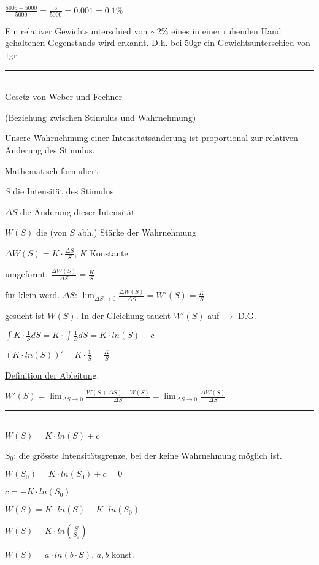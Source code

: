 \documentclass[18pt,a4paper]{scrreprt}
\begin{document}
$\frac{5005-5000}{5000} = \frac{5}{5000} = 0.001 = 0.1\%$

Ein relativer Gewichtsunterschied von $\sim 2\%$ eines in einer ruhenden Hand gehaltenen Gegenstands wird erkannt. D.h. bei $50$gr ein Gewichtsunterschied von $1$gr.

\rule{\textwidth}{0.4mm}\\

\uline{Gesetz von Weber und Fechner}

(Beziehung zwischen Stimulus und Wahrnehmung)

Unsere Wahrnehmung einer Intensitätsänderung ist proportional zur relativen Änderung des Stimulus.

Mathematisch formuliert:

$S$ die Intensität des Stimulus

$\Delta S$ die Änderung dieser Intensität

$W(S)$ die (von $S$ abh.) Stärke der Wahrnehmung

$\Delta W(S) = K \cdot \frac{\Delta S}{S}$, $K$ Konstante

umgeformt: $\frac{\Delta W(S)}{\Delta S} = \frac{K}{S}$

für klein werd. $\Delta S$: $\lim_{\Delta S\to 0} \frac{\Delta W(S)}{\Delta S} = W'(S) = \frac{K}{S}$

gesucht ist $W(S)$. In der Gleichung taucht $W'(S)$ auf $\rightarrow$ D.G.

$\int K \cdot \frac{1}{S} dS = K \cdot \int \frac{1}{S} dS = K \cdot ln(S) + c$

$(K\cdot ln(S))' = K \cdot \frac{1}{S} = \frac{K}{S}$

\uline{Definition der Ableitung}: 

$W'(S) = \lim_{\Delta S\to 0} \frac{W(S + \Delta S) - W(S)}{\Delta S} = \lim_{\Delta S\to 0} \frac{\Delta W(S)}{\Delta S}$

\rule{\textwidth}{0.4mm}\\

$W(S) = K \cdot ln(S) + c$

$S_0$: die grösste Intensitätsgrenze, bei der keine Wahrnehmung möglich ist.

$W(S_0) = K \cdot ln(S_0) + c = 0$

$c = -K \cdot ln(S_0)$

$W(S) = K \cdot ln(S) - K \cdot ln(S_0)$

$W(S) = K \cdot ln(\frac{S}{S_0})$

$W(S) = a \cdot ln(b\cdot S)$, $a,b$ konst.
\end{document}
